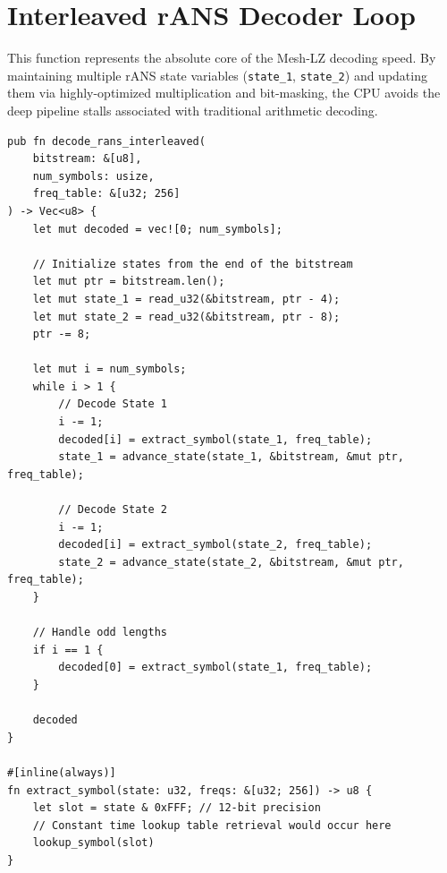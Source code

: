 \section{Interleaved rANS Decoder Loop}
This function represents the absolute core of the Mesh-LZ decoding speed. By maintaining multiple rANS state variables (\texttt{state\_1}, \texttt{state\_2}) and updating them via highly-optimized multiplication and bit-masking, the CPU avoids the deep pipeline stalls associated with traditional arithmetic decoding.

\begin{verbatim}
pub fn decode_rans_interleaved(
    bitstream: &[u8], 
    num_symbols: usize, 
    freq_table: &[u32; 256]
) -> Vec<u8> {
    let mut decoded = vec![0; num_symbols];
    
    // Initialize states from the end of the bitstream
    let mut ptr = bitstream.len();
    let mut state_1 = read_u32(&bitstream, ptr - 4);
    let mut state_2 = read_u32(&bitstream, ptr - 8);
    ptr -= 8;

    let mut i = num_symbols;
    while i > 1 {
        // Decode State 1
        i -= 1;
        decoded[i] = extract_symbol(state_1, freq_table);
        state_1 = advance_state(state_1, &bitstream, &mut ptr, freq_table);

        // Decode State 2
        i -= 1;
        decoded[i] = extract_symbol(state_2, freq_table);
        state_2 = advance_state(state_2, &bitstream, &mut ptr, freq_table);
    }

    // Handle odd lengths
    if i == 1 {
        decoded[0] = extract_symbol(state_1, freq_table);
    }
    
    decoded
}

#[inline(always)]
fn extract_symbol(state: u32, freqs: &[u32; 256]) -> u8 {
    let slot = state & 0xFFF; // 12-bit precision
    // Constant time lookup table retrieval would occur here
    lookup_symbol(slot)
}
\end{verbatim}

